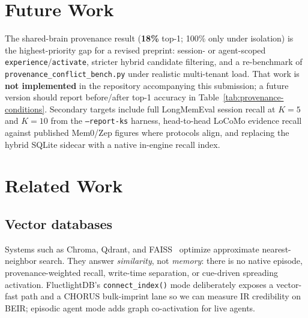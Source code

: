 \documentclass[11pt]{article}
\begin{document}
\section{Future Work}
\label{sec:future}
The shared-brain provenance result (\textbf{18\%} top-1; 100\% only under isolation) is the highest-priority
gap for a revised preprint: session- or agent-scoped \texttt{experience}/\texttt{activate},
stricter hybrid candidate filtering, and a re-benchmark of
\texttt{provenance\_conflict\_bench.py} under realistic multi-tenant load. That work
is \textbf{not implemented} in the repository accompanying this submission; a future
version should report before/after top-1 accuracy in Table~\ref{tab:provenance-conditions}.
Secondary targets include full LongMemEval session recall at $K{=}5$ and $K{=}10$ from
the \texttt{--report-ks} harness, head-to-head LoCoMo evidence recall against published
Mem0/Zep figures where protocols align, and replacing the hybrid SQLite sidecar with a
native in-engine recall index.

\section{Related Work}
\label{sec:related}
\subsection{Vector databases}
Systems such as Chroma, Qdrant, and FAISS~\cite{thakur2021beir} optimize approximate
nearest-neighbor search. They answer \emph{similarity}, not \emph{memory}: there is
no native episode, provenance-weighted recall, write-time separation, or
cue-driven spreading activation. FluctlightDB's \texttt{connect\_index()} mode
deliberately exposes a vector-fast path and a CHORUS bulk-imprint lane so we can
measure IR credibility on BEIR; episodic agent mode adds graph co-activation for
live agents.
\end{document}
